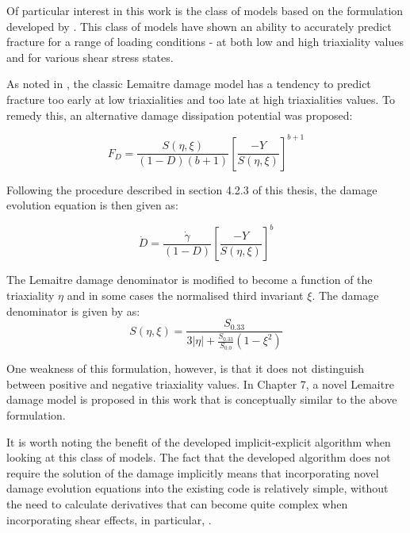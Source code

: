 \documentclass[sn-mathphys,Numbered,draft]{sn-jnl}%
\begin{document}
Of particular interest in this work is the class of models \cite{malcher_improved_2014,ferreira_improved_2022,castro_calibration_2018} based on the formulation developed by \citet{malcher_improved_2014}. This class of models have shown an ability to accurately predict fracture for a range of loading conditions - at both low and high triaxiality values and for various shear stress states.
 
As noted in \citet{malcher_improved_2014}, the classic Lemaitre damage model has a tendency to predict fracture too early at low triaxialities and too late at high triaxialities values. To remedy this, an alternative damage dissipation potential was proposed: 

\begin{equation}
	F_{D}=\frac{S(\eta,\xi)}{\left(1-D\right)\left(b+1\right)}\left[\frac{-Y}{S(\eta,\xi)}\right]^{b+1}
\end{equation}

 Following the procedure described in section 4.2.3 of this thesis, the damage evolution equation is then given as:

 \begin{equation}
	\dot{D}=\frac{\dot{\gamma}}{\left(1-D\right)}\left[\frac{-Y}{S(\eta,\xi)}\right]^b
\end{equation}

The Lemaitre damage denominator is modified to become a function of the triaxiality $\eta$ and in some cases the normalised third invariant $\xi$. The damage denominator is given by \citet{malcher_improved_2014} as:
\begin{equation}
S(\eta,\xi)=\frac{S_{0.33}}{3|\eta|+\frac{S_{0.33}}{S_{0.0}}\left(1-\xi^2\right)}
\end{equation}

One weakness of this formulation, however, is that it does not distinguish between positive and negative triaxiality values. In Chapter 7, a novel Lemaitre damage model is proposed in this work that is conceptually similar to the above formulation. 

It is worth noting the benefit of the developed implicit-explicit algorithm when looking at this class of models. The fact that the developed algorithm does not require the solution of the damage implicitly means that incorporating novel damage evolution equations into the existing code is relatively simple, without the need to calculate derivatives that can become quite complex when incorporating shear effects, in particular, \cite{malcher_improved_2014}.
\end{document}
